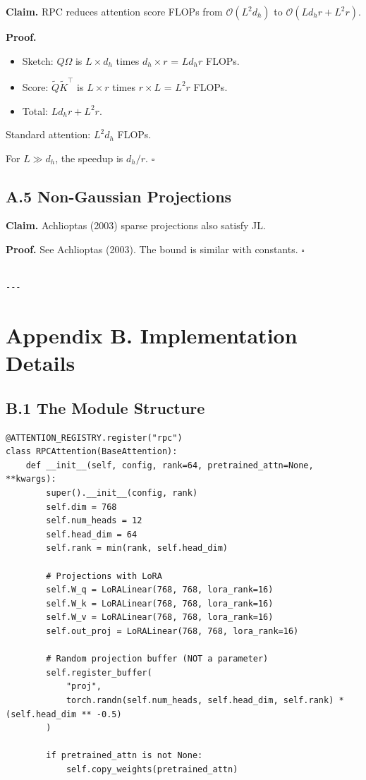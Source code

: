 \textbf{Claim.} RPC reduces attention score FLOPs from $\mathcal{O}(L^2 d_h)$ 
to $\mathcal{O}(L d_h r + L^2 r)$.

\textbf{Proof.}
\begin{itemize}
\item Sketch: $Q \Omega$ is $L \times d_h$ times $d_h \times r$ = $L d_h r$ FLOPs.
\item Score: $\tilde{Q} \tilde{K}^\top$ is $L \times r$ times $r \times L$ = $L^2 r$ FLOPs.
\item Total: $L d_h r + L^2 r$.

\end{itemize}
Standard attention: $L^2 d_h$ FLOPs.

For $L \gg d_h$, the speedup is $d_h / r$. $\square$

\subsection{A.5 Non-Gaussian Projections}

\textbf{Claim.} Achlioptas (2003) sparse projections also satisfy JL.

\textbf{Proof.} See Achlioptas (2003). The bound is similar with constants. $\square$
\begin{lstlisting}

---
\end{lstlisting}


\section{Appendix B. Implementation Details}

\subsection{B.1 The Module Structure}

\begin{lstlisting}
@ATTENTION_REGISTRY.register("rpc")
class RPCAttention(BaseAttention):
    def __init__(self, config, rank=64, pretrained_attn=None, **kwargs):
        super().__init__(config, rank)
        self.dim = 768
        self.num_heads = 12
        self.head_dim = 64
        self.rank = min(rank, self.head_dim)
        
        # Projections with LoRA
        self.W_q = LoRALinear(768, 768, lora_rank=16)
        self.W_k = LoRALinear(768, 768, lora_rank=16)
        self.W_v = LoRALinear(768, 768, lora_rank=16)
        self.out_proj = LoRALinear(768, 768, lora_rank=16)
        
        # Random projection buffer (NOT a parameter)
        self.register_buffer(
            "proj",
            torch.randn(self.num_heads, self.head_dim, self.rank) * (self.head_dim ** -0.5)
        )
        
        if pretrained_attn is not None:
            self.copy_weights(pretrained_attn)
\end{lstlisting}

